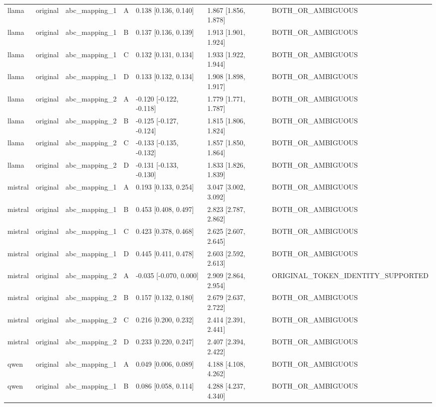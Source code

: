 \begin{tabular}{lllllll}
llama & original & abc\_mapping\_1 & A & 0.138 [0.136, 0.140] & 1.867 [1.856, 1.878] & BOTH\_OR\_AMBIGUOUS \\
llama & original & abc\_mapping\_1 & B & 0.137 [0.136, 0.139] & 1.913 [1.901, 1.924] & BOTH\_OR\_AMBIGUOUS \\
llama & original & abc\_mapping\_1 & C & 0.132 [0.131, 0.134] & 1.933 [1.922, 1.944] & BOTH\_OR\_AMBIGUOUS \\
llama & original & abc\_mapping\_1 & D & 0.133 [0.132, 0.134] & 1.908 [1.898, 1.917] & BOTH\_OR\_AMBIGUOUS \\
llama & original & abc\_mapping\_2 & A & -0.120 [-0.122, -0.118] & 1.779 [1.771, 1.787] & BOTH\_OR\_AMBIGUOUS \\
llama & original & abc\_mapping\_2 & B & -0.125 [-0.127, -0.124] & 1.815 [1.806, 1.824] & BOTH\_OR\_AMBIGUOUS \\
llama & original & abc\_mapping\_2 & C & -0.133 [-0.135, -0.132] & 1.857 [1.850, 1.864] & BOTH\_OR\_AMBIGUOUS \\
llama & original & abc\_mapping\_2 & D & -0.131 [-0.133, -0.130] & 1.833 [1.826, 1.839] & BOTH\_OR\_AMBIGUOUS \\
mistral & original & abc\_mapping\_1 & A & 0.193 [0.133, 0.254] & 3.047 [3.002, 3.092] & BOTH\_OR\_AMBIGUOUS \\
mistral & original & abc\_mapping\_1 & B & 0.453 [0.408, 0.497] & 2.823 [2.787, 2.862] & BOTH\_OR\_AMBIGUOUS \\
mistral & original & abc\_mapping\_1 & C & 0.423 [0.378, 0.468] & 2.625 [2.607, 2.645] & BOTH\_OR\_AMBIGUOUS \\
mistral & original & abc\_mapping\_1 & D & 0.445 [0.411, 0.478] & 2.603 [2.592, 2.613] & BOTH\_OR\_AMBIGUOUS \\
mistral & original & abc\_mapping\_2 & A & -0.035 [-0.070, 0.000] & 2.909 [2.864, 2.954] & ORIGINAL\_TOKEN\_IDENTITY\_SUPPORTED \\
mistral & original & abc\_mapping\_2 & B & 0.157 [0.132, 0.180] & 2.679 [2.637, 2.722] & BOTH\_OR\_AMBIGUOUS \\
mistral & original & abc\_mapping\_2 & C & 0.216 [0.200, 0.232] & 2.414 [2.391, 2.441] & BOTH\_OR\_AMBIGUOUS \\
mistral & original & abc\_mapping\_2 & D & 0.233 [0.220, 0.247] & 2.407 [2.394, 2.422] & BOTH\_OR\_AMBIGUOUS \\
qwen & original & abc\_mapping\_1 & A & 0.049 [0.006, 0.089] & 4.188 [4.108, 4.262] & BOTH\_OR\_AMBIGUOUS \\
qwen & original & abc\_mapping\_1 & B & 0.086 [0.058, 0.114] & 4.288 [4.237, 4.340] & BOTH\_OR\_AMBIGUOUS \\

\end{tabular}
